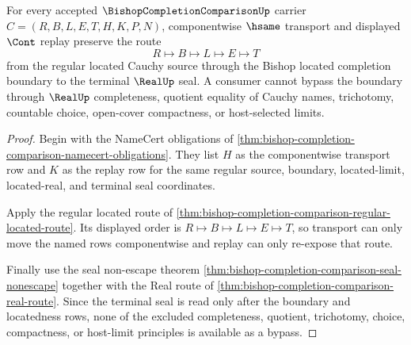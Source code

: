 \begin{theorem}
\label{thm:bishop-completion-comparison-boundary-transport}
For every accepted $\BishopCompletionComparisonUp$ carrier $C=(R,B,L,E,T,H,K,P,N)$, componentwise $\hsame$ transport and displayed $\Cont$ replay preserve the route
$$
R\longmapsto B\longmapsto L\longmapsto E\longmapsto T
$$
from the regular located Cauchy source through the Bishop located completion boundary to the terminal $\RealUp$ seal. A consumer cannot bypass the boundary through $\RealUp$ completeness, quotient equality of Cauchy names, trichotomy, countable choice, open-cover compactness, or host-selected limits.
\end{theorem}
\begin{proof}
Begin with the NameCert obligations of \autoref{thm:bishop-completion-comparison-namecert-obligations}. They list $H$ as the componentwise transport row and $K$ as the replay row for the same regular source, boundary, located-limit, located-real, and terminal seal coordinates.

Apply the regular located route of \autoref{thm:bishop-completion-comparison-regular-located-route}. Its displayed order is $R\longmapsto B\longmapsto L\longmapsto E\longmapsto T$, so transport can only move the named rows componentwise and replay can only re-expose that route.

Finally use the seal non-escape theorem \autoref{thm:bishop-completion-comparison-seal-nonescape} together with the Real route of \autoref{thm:bishop-completion-comparison-real-route}. Since the terminal seal is read only after the boundary and locatedness rows, none of the excluded completeness, quotient, trichotomy, choice, compactness, or host-limit principles is available as a bypass.
\end{proof}

